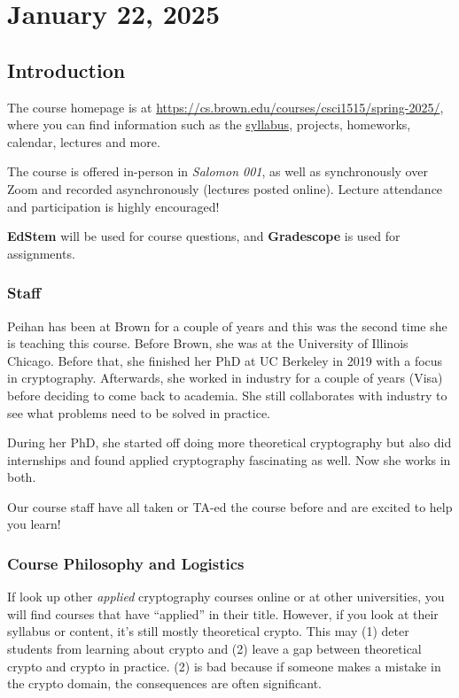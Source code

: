 \section{January 22, 2025}
\label{20240124}

\subsection{Introduction}
The course homepage is at \url{https://cs.brown.edu/courses/csci1515/spring-2025/}, where you can find information such as the \href{https://docs.google.com/document/d/14G3OhOOvd6b84vhYAXK9slAUbNgQte-34sGe9bhMOYA/edit?usp=sharing}{syllabus}, projects, homeworks, calendar, lectures and more.

The course is offered in-person in \emph{Salomon 001}, as well as synchronously over Zoom and recorded asynchronously (lectures posted online). Lecture attendance and participation is highly encouraged!

\textbf{EdStem} will be used for course questions, and \textbf{Gradescope} is used for assignments.

\subsubsection{Staff}

Peihan has been at Brown for a couple of years and this was the second time she is teaching this course. Before Brown, she was at the University of Illinois Chicago. Before that, she finished her PhD at UC Berkeley in 2019 with a focus in cryptography. Afterwards, she worked in industry for a couple of years (Visa) before deciding to come back to academia. She still collaborates with industry to see what problems need to be solved in practice.

During her PhD, she started off doing more theoretical cryptography but also did internships and found applied cryptography fascinating as well. Now she works in both.

Our course staff have all taken or TA-ed the course before and are excited to help you learn!

\subsubsection{Course Philosophy and Logistics}

If look up other \emph{applied} cryptography courses online or at other universities, you will find courses that have ``applied'' in their title. However, if you look at their syllabus or content, it's still mostly theoretical crypto. This may (1) deter students from learning about crypto and (2) leave a gap between theoretical crypto and crypto in practice. (2) is bad because if someone makes a mistake in the crypto domain, the consequences are often significant.


